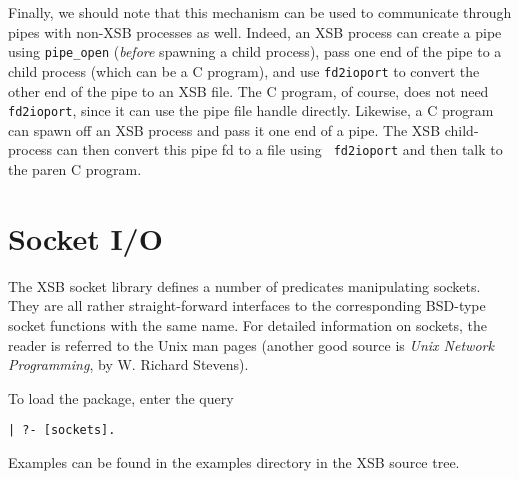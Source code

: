 \begin{description}
    Finally, we should note that this mechanism can be used to communicate
    through pipes with non-XSB processes as well. Indeed, an XSB process
    can create a pipe using {\tt pipe\_open} (\emph{before} spawning a
    child process), pass one end of the pipe to a child process (which can
    be a C program), and use {\tt fd2ioport} to convert the other end of
    the pipe to an XSB file. The C program, of course, does not need {\tt
      fd2ioport}, since it can use the pipe file handle directly. Likewise,
    a C program can spawn off an XSB process and pass it one end of a pipe.
    The XSB child-process can then convert this pipe fd to a file using {\tt
      fd2ioport} and then talk to the paren C program.

\end{description}



\section{Socket I/O}

The XSB socket library defines a number of predicates manipulating
sockets. They are all rather straight-forward interfaces to the
corresponding BSD-type socket functions with the same name. For detailed
information on sockets, the reader is referred to the Unix man pages
(another good source is \emph{Unix Network Programming}, by W. Richard
Stevens).

To load the package, enter the query 
\begin{verbatim}
| ?- [sockets].
\end{verbatim}

Examples can be found in the examples directory in the XSB source tree.

